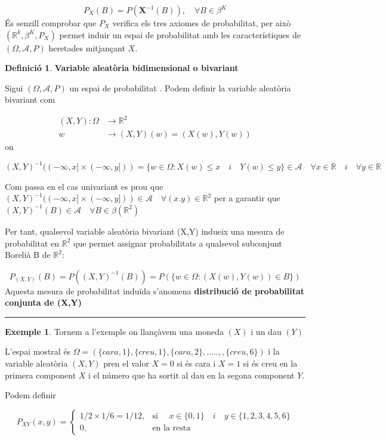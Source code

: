 \documentclass[
  catalan,
]{article}
\theoremstyle{definition}
\newtheorem{definition}{Definició}[section]
\theoremstyle{definition}
\newtheorem{example}{Exemple}[section]
\theoremstyle{definition}
\theoremstyle{definition}
\theoremstyle{remark}
\begin{document}
\[
P_X(B)=P(\mathbf{X}^{-1}(B)), \quad \forall B \in \beta^K \label{eq:pvectorind}
\]
És senzill comprobar que \(P_X\) verifica els tres axiomes de probabilitat, per això \((\mathbb{R}^k,\beta^K, P_X)\) permet induir un espai de probabilitat amb les característiques de \((\Omega,\mathcal{A},P)\) heretades mitjançant \(X\).

\begin{definition}
\textbf{Variable aleatòria bidimensional o bivariant}

Sigui \((\Omega, \mathcal{A},P)\) un espai de probabilitat . Podem definir la variable aleatòria bivariant com

\[
\begin{aligned}
(X,Y): \Omega &\rightarrow \mathbb{R}^2 \\
w & \rightarrow (X,Y)(w) =(X(w),Y(w))
\end{aligned}
\]
on

\((X,Y)^{-1}(( -\infty, x]  \times (-\infty, y]))=\{w \in \Omega: X(w) \leq x \quad i \quad  Y(w) \leq y \} \in \mathcal{A} \quad \forall x \in \mathbb{R} \quad i \quad \forall y \in \mathbb{R}\)
\end{definition}

Com passa en el cas univariant es prou que \((X,Y)^{-1}(( -\infty, x]  \times (-\infty, y])) \in \mathcal{A} \quad \forall (x.y)\in \mathbb{R}^2\) per a garantir que \((X,Y)^{-1}(B) \in  \mathcal{A} \quad \forall B \in \beta (\mathbb{R}^2)\)

Per tant, qualsevol variable aleatòria bivariant (X,Y) indueix una mesura de probabilitat en \(\mathbb{R}^2\) que permet assignar probabilitats a qualsevol subconjunt Borelià B de \(\mathbb{R}^2\):

\[
P_{(X,Y)}(B)=P((X,Y)^{-1}(B))=P(\{w \in \Omega:(X(w),Y(w)) \in B\})  \label{eq:pconjunt}
\]
Aquesta mesura de probabilitat induïda s'anomena \textbf{distribució de probabilitat conjunta de (X,Y)}

\begin{center}\rule{0.5\linewidth}{0.5pt}\end{center}

\begin{example}
Tornem a l'exemple on llançàvem una moneda \((X)\) i un dau \((Y)\)

L'espai mostral és \(\Omega=(\{cara,1\},\{creu,1\},\{cara,2\},.....,,\{creu,6\})\)
i la variable aleatòria \((X,Y)\) pren el valor \(X= 0\) si és cara i \(X=1\) si és creu en la primera component \(X\) i el número que ha sortit al dau en la segona component \(Y\).

Podem definir

\[
P_{XY}(x,y)=
\begin{cases}
1/2 \times 1/6=1/12, & \text{si } \quad  x \in \{ 0,1\}  \quad i \quad y \in \{ 1,2,3,4,5,6\} \\
0, & \text{en la resta}
\end{cases}
\]
\end{example}
\end{document}
